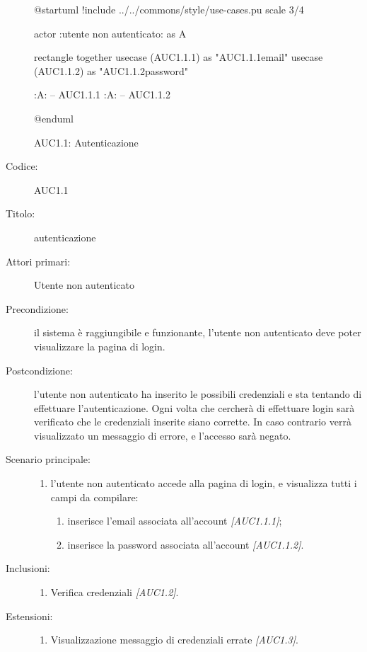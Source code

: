 \documentclass[casi-duso]{subfiles}
\begin{document}
\begin{figure}[h!] 
  \centering 
  \begin{plantuml}
  @startuml
  !include ../../commons/style/use-cases.pu
  scale 3/4

  actor :utente non autenticato: as A

  rectangle {
    together {
    usecase (AUC1.1.1) as "AUC1.1.1\nInserimento email"
    usecase (AUC1.1.2) as "AUC1.1.2\nInserimento password"
    }
  }

  :A: -- AUC1.1.1
  :A: -- AUC1.1.2

  @enduml
  \end{plantuml} 
  \caption{AUC1.1: Autenticazione} 
  \label{fig:auc1_1} 
\end{figure}

\begin{description}
  \item[Codice:] AUC1.1
  \item[Titolo:] autenticazione
  \item[Attori primari:] Utente non autenticato
  \item[Precondizione:] il sistema è raggiungibile e funzionante, l'utente non autenticato deve poter visualizzare la pagina di login.
  \item[Postcondizione:] l'utente non autenticato ha inserito le possibili credenziali e sta tentando di effettuare l'autenticazione. Ogni volta che cercherà di effettuare
        login sarà verificato che le credenziali inserite siano corrette. In caso contrario verrà visualizzato un messaggio di errore, e l'accesso sarà negato.
  \item[Scenario principale:]
  \begin{enumerate}
    \item  l'utente non autenticato accede alla pagina di login, e visualizza tutti i campi da compilare:
    \begin{enumerate}
      \item inserisce l’email associata all’account \emph{[AUC1.1.1]};
      \item inserisce la password associata all’account \emph{[AUC1.1.2]}.
    \end{enumerate}
  \end{enumerate}
  \item[Inclusioni:]
  \begin{enumerate}
    \item Verifica credenziali \emph{[AUC1.2]}.
  \end{enumerate}
  \item[Estensioni:]
  \begin{enumerate}
    \item Visualizzazione messaggio di credenziali errate \emph{[AUC1.3]}.
  \end{enumerate}
\end{description}
\end{document}

